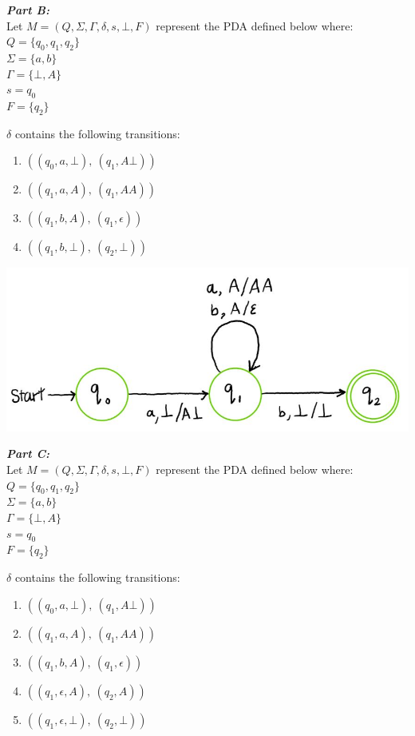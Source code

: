 \documentclass[11pt,fleqn]{article}
\newcommand{\be}{\begin{enumerate}}
\newcommand{\ee}{\end{enumerate}}
\newcommand{\set}[1]{{\{ #1 \}}}
\begin{document}
	\noindent\textbf{\emph{Part B:}}\\
	Let $M = (Q, \Sigma, \Gamma, \delta, s, \bot, F)$ represent the PDA defined below where:\\
	$Q = \set{q_0, q_1, q_2}$\\
	$\Sigma = \set{a, b}$\\
	$\Gamma = \set{\bot, A}$\\
	$s = q_0$\\
	$F = \set{q_2}$

	\noindent$\delta$ contains the following transitions:
	\be
	\item $((q_0, a, \bot),\ (q_1, A\bot))$
	\item $((q_1, a, A),\ (q_1, AA))$
	\item $((q_1, b, A),\ (q_1, \epsilon))$
	\item $((q_1, b, \bot),\ (q_2, \bot))$
	\ee

	\begin{center}
	\includegraphics[scale = 0.5]{partB.JPG}
	\end{center}

	\noindent\textbf{\emph{Part C:}}\\
	Let $M = (Q, \Sigma, \Gamma, \delta, s, \bot, F)$ represent the PDA defined below where:\\
	$Q = \set{q_0, q_1, q_2}$\\
	$\Sigma = \set{a, b}$\\
	$\Gamma = \set{\bot, A}$\\
	$s = q_0$\\
	$F = \set{q_2}$

	\noindent$\delta$ contains the following transitions:
	\be
	\item $((q_0, a, \bot),\ (q_1, A\bot))$
	\item $((q_1, a, A),\ (q_1, AA))$
	\item $((q_1, b, A),\ (q_1, \epsilon))$
	\item $((q_1, \epsilon, A),\ (q_2, A))$
	\item $((q_1, \epsilon, \bot),\ (q_2, \bot))$
	\ee
\end{document}
